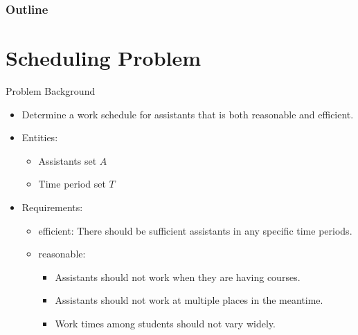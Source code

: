 
\begin{frame}[t,plain]
\titlepage
\end{frame}

\begin{frame}
  \frametitle{Outline}
  \tableofcontents
\end{frame}



\section{Scheduling Problem}
\begin{frame}[t]{Problem Background}
  \begin{itemize}[<+->]
    \item Determine a work schedule for assistants that is both reasonable
       and efficient.
    \item Entities:
      \begin{itemize}
        \item Assistants set $A$
        \item Time period set $T$
      \end{itemize}
    \item Requirements:
      \begin{itemize}
        \item efficient: There should be sufficient assistants in any specific
          time periods.
        \item reasonable:
          \begin{itemize}
            \item Assistants should not work when they are having courses.
            \item Assistants should not work at multiple places in the meantime.
            \item Work times among students should not vary widely.
          \end{itemize}
      \end{itemize}
  \end{itemize}
\end{frame}

